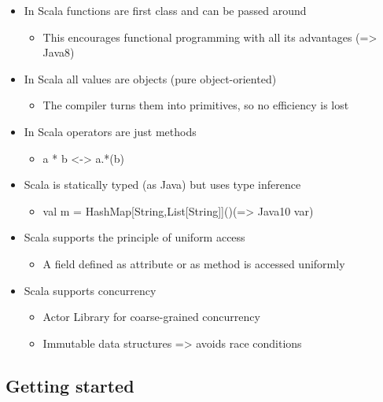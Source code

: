 \begin{itemize}
\tightlist
\item
  In Scala functions are first class and can be passed around

  \begin{itemize}
  \tightlist
  \item
    This encourages functional programming with all its advantages
    (=\textgreater{} Java8)
  \end{itemize}
\item
  In Scala all values are objects (pure object-oriented)

  \begin{itemize}
  \tightlist
  \item
    The compiler turns them into primitives, so no efficiency is lost
  \end{itemize}
\item
  In Scala operators are just methods

  \begin{itemize}
  \tightlist
  \item
    a * b \textless{}-\textgreater{} a.*(b)
  \end{itemize}
\item
  Scala is statically typed (as Java) but uses type inference

  \begin{itemize}
  \tightlist
  \item
    val m = HashMap{[}String,List{[}String{]}{]}()(=\textgreater{}
    Java10 var)
  \end{itemize}
\item
  Scala supports the principle of uniform access

  \begin{itemize}
  \tightlist
  \item
    A field defined as attribute or as method is accessed uniformly
  \end{itemize}
\item
  Scala supports concurrency

  \begin{itemize}
  \tightlist
  \item
    Actor Library for coarse-grained concurrency
  \item
    Immutable data structures =\textgreater{} avoids race conditions
  \end{itemize}
\end{itemize}

\hypertarget{getting-started}{%
\subsection{Getting started}\label{getting-started}}

